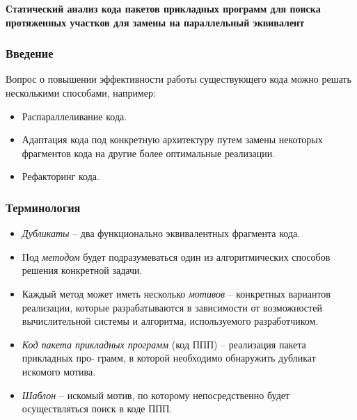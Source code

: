 \documentclass{beamer}
\begin{document}

\begin{frame}
\begin{center}
    \textsf{\bfseries
       {\Large Статический анализ кода пакетов прикладных программ для поиска протяженных
        участков для замены на параллельный эквивалент}
    }\\[7mm]
\end{center}
\end{frame}







\begin{frame}
\frametitle{Введение}
Вопрос о повышении эффективности работы существующего кода можно решать несколькими способами, например: 
\begin{itemize}
	\item Распараллеливание кода.
	\item Адаптация кода под конкретную архитектуру путем замены некоторых фрагментов
кода на другие более оптимальные реализации.
	\item Рефакторинг кода.
\end{itemize}
\end{frame}

\begin{frame}
\frametitle{Терминология}
\begin{itemize}
	\item \textit{Дубликаты} -- два функционально эквивалентных фрагмента кода.
	\item Под \textit{методом} будет подразумеваться один из алгоритмических способов решения конкретной задачи.
	\item Каждый метод может иметь несколько \textit{мотивов} – конкретных вариантов реализации, которые разрабатываются в зависимости от возможностей вычислительной системы и алгоритма, используемого разработчиком.
	\item \textit{Код пакета прикладных программ} (код ППП) – реализация пакета прикладных про-
грамм, в которой необходимо обнаружить дубликат искомого мотива.
	\item \textit{Шаблон} -- искомый мотив, по которому непосредственно будет осуществляться поиск в коде ППП.
\end{itemize}
\end{frame}
\end{document}
